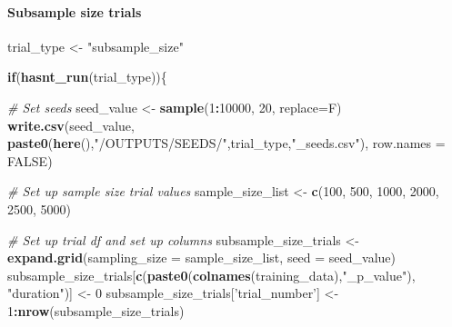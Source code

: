 \documentclass[12pt]{article}
\newenvironment{Shaded}{\begin{snugshade}}{\end{snugshade}}
\newcommand{\CommentTok}[1]{\textcolor[rgb]{0.56,0.35,0.01}{\textit{#1}}}
\newcommand{\ControlFlowTok}[1]{\textcolor[rgb]{0.13,0.29,0.53}{\textbf{#1}}}
\newcommand{\DataTypeTok}[1]{\textcolor[rgb]{0.13,0.29,0.53}{#1}}
\newcommand{\DecValTok}[1]{\textcolor[rgb]{0.00,0.00,0.81}{#1}}
\newcommand{\KeywordTok}[1]{\textcolor[rgb]{0.13,0.29,0.53}{\textbf{#1}}}
\newcommand{\NormalTok}[1]{#1}
\newcommand{\OperatorTok}[1]{\textcolor[rgb]{0.81,0.36,0.00}{\textbf{#1}}}
\newcommand{\OtherTok}[1]{\textcolor[rgb]{0.56,0.35,0.01}{#1}}
\newcommand{\StringTok}[1]{\textcolor[rgb]{0.31,0.60,0.02}{#1}}
\begin{document}
\hypertarget{subsample-size-trials}{%
\paragraph{Subsample size trials}\label{subsample-size-trials}}

\begin{Shaded}
\begin{Highlighting}[]
\NormalTok{trial_type <-}\StringTok{ "subsample_size"}

\ControlFlowTok{if}\NormalTok{(}\KeywordTok{hasnt_run}\NormalTok{(trial_type))\{}

  \CommentTok{# Set seeds}
\NormalTok{  seed_value <-}\StringTok{ }\KeywordTok{sample}\NormalTok{(}\DecValTok{1}\OperatorTok{:}\DecValTok{10000}\NormalTok{, }\DecValTok{20}\NormalTok{, }\DataTypeTok{replace=}\NormalTok{F)}
  \KeywordTok{write.csv}\NormalTok{(seed_value, }\KeywordTok{paste0}\NormalTok{(}\KeywordTok{here}\NormalTok{(),}\StringTok{"/OUTPUTS/SEEDS/"}\NormalTok{,trial_type,}\StringTok{"_seeds.csv"}\NormalTok{), }\DataTypeTok{row.names =} \OtherTok{FALSE}\NormalTok{)}
  
  \CommentTok{# Set up sample size trial values}
\NormalTok{  sample_size_list <-}\StringTok{ }\KeywordTok{c}\NormalTok{(}\DecValTok{100}\NormalTok{, }\DecValTok{500}\NormalTok{, }\DecValTok{1000}\NormalTok{, }\DecValTok{2000}\NormalTok{, }\DecValTok{2500}\NormalTok{, }\DecValTok{5000}\NormalTok{)}
  
  \CommentTok{# Set up trial df and set up columns}
\NormalTok{  subsample_size_trials <-}\StringTok{ }\KeywordTok{expand.grid}\NormalTok{(}\DataTypeTok{sampling_size =}\NormalTok{ sample_size_list, }\DataTypeTok{seed =}\NormalTok{ seed_value)}
\NormalTok{  subsample_size_trials[}\KeywordTok{c}\NormalTok{(}\KeywordTok{paste0}\NormalTok{(}\KeywordTok{colnames}\NormalTok{(training_data),}\StringTok{"_p_value"}\NormalTok{), }\StringTok{"duration"}\NormalTok{)] <-}\StringTok{ }\DecValTok{0}
\NormalTok{  subsample_size_trials[}\StringTok{'trial_number'}\NormalTok{] <-}\StringTok{ }\DecValTok{1}\OperatorTok{:}\KeywordTok{nrow}\NormalTok{(subsample_size_trials)}


\end{Highlighting}
\end{Shaded}
\end{document}
